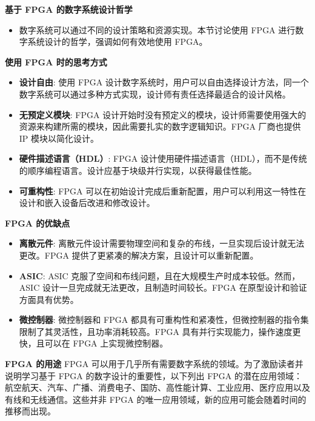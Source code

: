 \begin{frame}
\begin{block}{\textbf{基于 FPGA 的数字系统设计哲学}}
\label{ux57faux4e8e-fpga-ux7684ux6570ux5b57ux7cfbux7edfux8bbeux8ba1ux54f2ux5b66}
\begin{itemize}
\tightlist
\item
    数字系统可以通过不同的设计策略和资源实现。本节讨论使用 FPGA
    进行数字系统设计的哲学，强调如何有效地使用 FPGA。
\end{itemize}
\end{block}

\begin{block}{\textbf{使用 FPGA 时的思考方式}}
\label{ux4f7fux7528-fpga-ux65f6ux7684ux601dux8003ux65b9ux5f0f}
\begin{itemize}
\tightlist
\item
    \textbf{设计自由}: 使用 FPGA
    设计数字系统时，用户可以自由选择设计方法，同一个数字系统可以通过多种方式实现，设计师有责任选择最适合的设计风格。
\item
    \textbf{无预定义模块}: FPGA
    设计开始时没有预定义的模块，设计师需要使用强大的资源来构建所需的模块，因此需要扎实的数字逻辑知识。FPGA
    厂商也提供 IP 模块以简化设计。
\item
    \textbf{硬件描述语言（HDL）}: FPGA
    设计使用硬件描述语言（HDL），而不是传统的顺序编程语言。设计应基于块级并行实现，以获得最佳性能。
\item
    \textbf{可重构性}: FPGA
    可以在初始设计完成后重新配置，用户可以利用这一特性在设计和嵌入设备后改进和修改设计。
\end{itemize}
\end{block}

\begin{block}{\textbf{FPGA 的优缺点}}
\label{fpga-ux7684ux4f18ux7f3aux70b9}
\begin{itemize}
\tightlist
\item
    \textbf{离散元件}:
    离散元件设计需要物理空间和复杂的布线，一旦实现后设计就无法更改。FPGA
    提供了更紧凑的解决方案，且设计可以重新配置。
\item
    \textbf{ASIC}: ASIC
    克服了空间和布线问题，且在大规模生产时成本较低。然而，ASIC
    设计一旦完成就无法更改，且制造时间较长。FPGA
    在原型设计和验证方面具有优势。
\item
    \textbf{微控制器}: 微控制器和 FPGA
    都具有可重构性和紧凑性，但微控制器的指令集限制了其灵活性，且功率消耗较高。FPGA
    具有并行实现能力，操作速度更快，且可以在 FPGA 上实现微控制器。
\end{itemize}
\end{block}

\begin{block}{\textbf{FPGA 的用途}}
\label{fpga-ux7684ux7528ux9014}
FPGA 可以用于几乎所有需要数字系统的领域。为了激励读者并说明学习基于 FPGA
的数字设计的重要性，以下列出 FPGA
的潜在应用领域：航空航天、汽车、广播、消费电子、国防、高性能计算、工业应用、医疗应用以及有线和无线通信。这些并非
FPGA 的唯一应用领域，新的应用可能会随着时间的推移而出现。
\end{block}
\end{frame}

